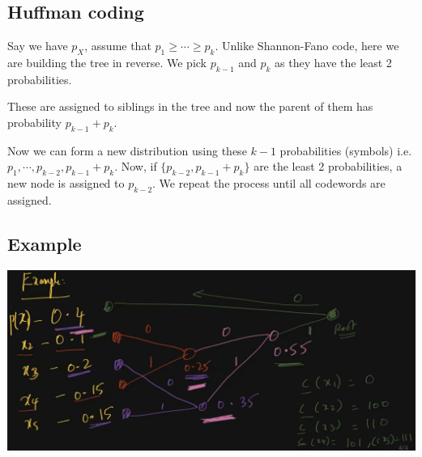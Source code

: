 \documentclass{article}
\begin{document}
\subsection{Huffman coding}

Say we have $p_X$, assume that $p_1 \geq \cdots \geq p_k$. Unlike Shannon-Fano code, here we are building the tree in reverse. We pick $p_{k-1}$ and $p_k$ as they have the least 2 probabilities.

These are assigned to siblings in the tree and now the parent of them has probability $p_{k-1}+ p_k$.

Now we can form a new distribution using these $k-1$ probabilities (symbols) i.e. $p_1, \cdots, p_{k-2}, p_{k-1}+ p_k$. Now, if $\{ p_{k-2}, p_{k-1}+ p_k \}$ are the least 2 probabilities, a new node is assigned to $p_{k-2}$.
We repeat the process until all codewords are assigned.

\subsection{Example}

\includegraphics[width=\textwidth]{huffmaneg.png}
\end{document}
